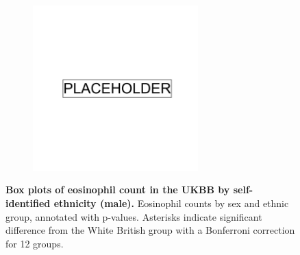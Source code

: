 \begin{figure}[ht]
    \centering
    \begin{subfigure}{\textwidth}
    \includegraphics[width=0.7\textwidth]{placeholder.png}
    \end{subfigure}
    \caption[Box plots of eosinophil count in the UKBB by self-identified ethnicity (male)]{\textbf{Box plots of eosinophil count in the UKBB by self-identified ethnicity (male).} Eosinophil counts by sex and ethnic group, annotated with p-values. Asterisks indicate significant difference from the White British group with a Bonferroni correction for 12 groups.}
    \label{fig:supp_box_eosinophill_m}
\end{figure}

\newpage

